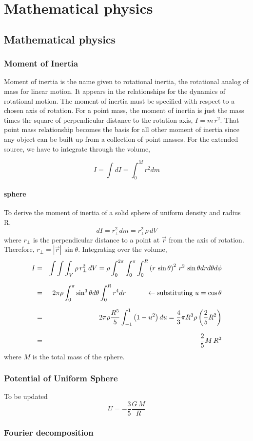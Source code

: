 \chapter{Mathematical physics}

\section{Mathematical physics}

\subsection{Moment of Inertia}

Moment of inertia is the name given to rotational inertia, the rotational analog of mass for
linear motion.  It appears in the relationships for the dynamics of rotational motion. The
moment of inertia must be specified with respect to a chosen axis of rotation. For a point
mass, the moment of inertia is just the mass times the square of perpendicular distance to
the rotation axis, $I=m\,r^{2}$. That point mass relationship becomes the basis for all other
moment of inertia since any object can be built up from a collection of point masses. For the
extended source, we have to integrate through the volume,

\begin{equation}
   I = \int dI = \int^{M}_{0}r^{2}dm
\end{equation}

\subsubsection{sphere}

To derive the moment of inertia of a solid sphere of uniform density and radius R,
\begin{equation}
   dI = r^{2}_{\perp} dm = r^{2}_{\perp}\rho\,dV
\end{equation}
where $r_{\perp}$ is the perpendicular distance to a point at $\vec{r}$ from the axis of rotation.
Therefore, $r_{\perp}= |\vec{r}|\,\sin{\theta}$. Integrating over the volume,
\begin{eqnarray}
   I &=& \int \int \int_{V} \rho\,r^{2}_{\perp}\,dV = \rho \int^{2\pi}_{0}\int^{\pi}_{0}\int^{R}_{0} \left( r\,\sin{\theta} \right)^{2}\,r^{2}\,\sin{\theta}drd\theta d\phi \nonumnext
     &=& 2\pi\rho \int^{\pi}_{0} \sin^{3}{\theta}d\theta \int^{R}_{0}r^{4}dr ~~~~~~~~~ \leftarrow \textrm{substituting } u=\cos{\theta} \nonumnext
     &=& 2\pi\rho \frac{R^{5}}{5}\int^{1}_{-1} \left( 1 - u^{2} \right) du = \frac{4}{3}\pi R^{3}\rho\left( \frac{2}{5} R^{2}\right) \nonumnext
     &=& \frac{2}{5}M\,R^{2}
\end{eqnarray}
where $M$ is the total mass of the sphere.


\bigskip
\subsection{Potential of Uniform Sphere}\label{subsec:potunisp}
To be updated
\begin{equation}
    U = -\frac{3}{5} \frac{G\,M}{R}
\end{equation}

\bigskip
\subsection{Fourier decomposition}


